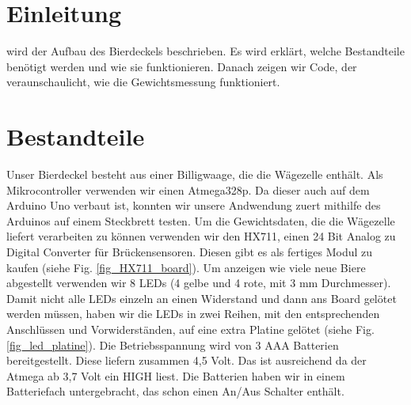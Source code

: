 \documentclass[12pt,journal,compsoc]{IEEEtran}
\begin{document}
\section{Einleitung}

% 
% 
% 
% 
 wird der Aufbau des Bierdeckels beschrieben.
Es wird erklärt, welche Bestandteile benötigt werden und wie sie funktionieren.
Danach zeigen wir Code, der veraunschaulicht, wie die Gewichtsmessung funktioniert.


\section{Bestandteile}

Unser Bierdeckel besteht aus einer Billigwaage, die die Wägezelle enthält.
Als Mikrocontroller verwenden wir einen Atmega328p. Da dieser auch auf dem Arduino Uno verbaut
ist, konnten wir unsere Andwendung zuert mithilfe des Arduinos auf einem Steckbrett testen.
Um die Gewichtsdaten, die die Wägezelle liefert verarbeiten zu können verwenden wir den HX711,
einen 24 Bit Analog zu Digital Converter für Brückensensoren. Diesen gibt es als fertiges Modul
zu kaufen (siehe Fig. \ref{fig_HX711_board}). Um anzeigen wie viele neue Biere abgestellt verwenden wir 8 LEDs
(4 gelbe und 4 rote, mit 3 mm Durchmesser). Damit nicht alle LEDs einzeln an einen Widerstand
und dann ans Board gelötet werden müssen, haben wir die LEDs in zwei Reihen, mit den
entsprechenden Anschlüssen und Vorwiderständen, auf eine extra Platine gelötet (siehe Fig. \ref{fig_led_platine}).
Die Betriebsspannung wird von 3 AAA Batterien bereitgestellt. Diese liefern zusammen 4,5 Volt.
Das ist ausreichend da der Atmega ab 3,7 Volt ein HIGH liest. Die Batterien haben wir in einem
Batteriefach untergebracht, das schon einen An/Aus Schalter enthält.
\end{document}
